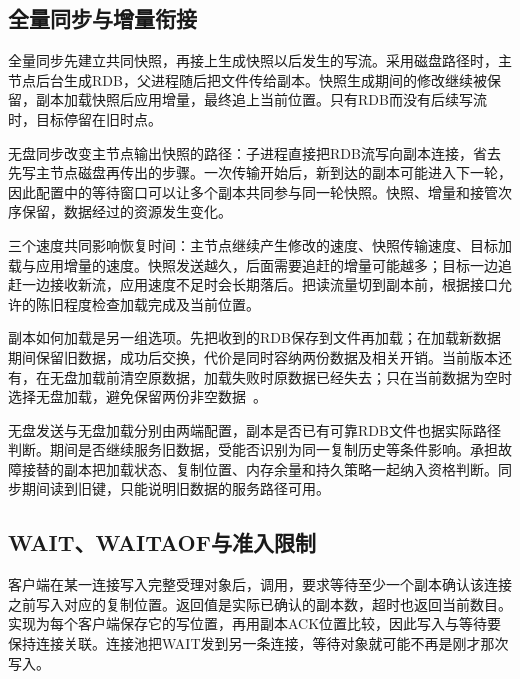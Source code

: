 \subsection{全量同步与增量衔接}

全量同步先建立共同快照，再接上生成快照以后发生的写流。采用磁盘路径时，主节点后台生成RDB，父进程随后把文件传给副本。快照生成期间的修改继续被保留，副本加载快照后应用增量，最终追上当前位置。只有RDB而没有后续写流时，目标停留在旧时点。

无盘同步改变主节点输出快照的路径：子进程直接把RDB流写向副本连接，省去先写主节点磁盘再传出的步骤。一次传输开始后，新到达的副本可能进入下一轮，因此配置中的等待窗口可以让多个副本共同参与同一轮快照。快照、增量和接管次序保留，数据经过的资源发生变化。

三个速度共同影响恢复时间：主节点继续产生修改的速度、快照传输速度、目标加载与应用增量的速度。快照发送越久，后面需要追赶的增量可能越多；目标一边追赶一边接收新流，应用速度不足时会长期落后。把读流量切到副本前，根据接口允许的陈旧程度检查加载完成及当前位置。


副本如何加载是另一组选项。先把收到的RDB保存到文件再加载；在加载新数据期间保留旧数据，成功后交换，代价是同时容纳两份数据及相关开销。当前版本还有，在无盘加载前清空原数据，加载失败时原数据已经失去；只在当前数据为空时选择无盘加载，避免保留两份非空数据~\cite{redis8102-source}。


无盘发送与无盘加载分别由两端配置，副本是否已有可靠RDB文件也据实际路径判断。期间是否继续服务旧数据，受能否识别为同一复制历史等条件影响。承担故障接替的副本把加载状态、复制位置、内存余量和持久策略一起纳入资格判断。同步期间读到旧键，只能说明旧数据的服务路径可用。

\subsection{WAIT、WAITAOF与准入限制}

客户端在某一连接写入完整受理对象后，调用，要求等待至少一个副本确认该连接之前写入对应的复制位置。返回值是实际已确认的副本数，超时也返回当前数目。实现为每个客户端保存它的写位置，再用副本ACK位置比较，因此写入与等待要保持连接关联。连接池把WAIT发到另一条连接，等待对象就可能不再是刚才那次写入。

